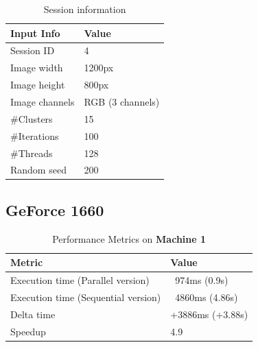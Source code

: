     \begin{table}[H]
        \centering
        \begin{tabular}{|l|l|}
        \hline
        \textbf{Input Info}                    & \textbf{Value}                       \\ \hline
        Session ID                             & 4                                     \\ \hline
        Image width                            & 1200px                                \\ \hline
        Image height                           & 800px                                 \\ \hline
        Image channels                         & RGB (3 channels)                      \\ \hline
        \#Clusters                             & 15                                    \\ \hline
        \#Iterations                           & 100                                   \\ \hline
        \#Threads                              & 128                                   \\ \hline
        Random seed                            & 200                                   \\ \hline
        \end{tabular}
        \caption{Session information}
        \label{tab:session_information_test5}
        \end{table}
        

        \subsection{GeForce 1660}

        \begin{table}[H]
            \centering
            \begin{tabular}{|l|l|}
            \hline
            \textbf{Metric}                         & \textbf{Value}                       \\ \hline
            Execution time (Parallel version)       & ~974ms (0.9s)                        \\ \hline
            Execution time (Sequential version)     & ~4860ms (4.86s)                      \\ \hline
            Delta time                               & +3886ms (+3.88s)                     \\ \hline
            Speedup                                  & 4.9                                   \\ \hline
            \end{tabular}
            \caption{Performance Metrics on \textbf{Machine 1}}
            \label{table:performance_metrics_test5_machine1}
        \end{table}
        
